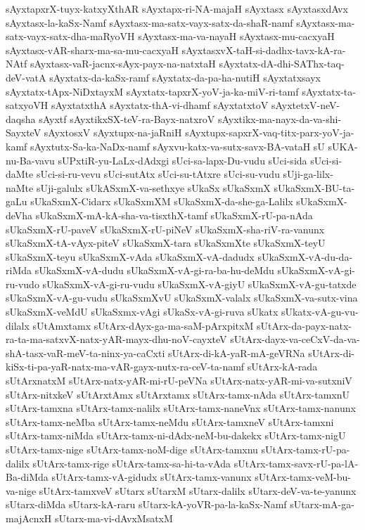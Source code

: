 {sAyxtapxrX-tuyx-katxyXthAR
sAyxtapx-ri-NA-majaH
sAyxtasx
sAyxtasxdAvx
sAyxtasx-la-kaSx-Namf
sAyxtasx-ma-satx-vayx-satx-da-shaR-namf
sAyxtasx-ma-satx-vayx-satx-dha-maRyoVH
sAyxtasx-ma-va-nayaH
sAyxtasx-mu-cacxyaH
sAyxtasx-vAR-sharx-ma-sa-mu-cacxyaH
sAyxtasxvX-taH-si-dadhx-tavx-kA-ra-NAtf
sAyxtasx-vaR-jacnx-sAyx-payx-na-natxtaH
sAyxtatx-dA-dhi-SAThx-taq-deV-vatA
sAyxtatx-da-kaSx-ramf
sAyxtatx-da-pa-ha-nutiH
sAyxtatxsayx
sAyxtatx-tApx-NiDxtayxM
sAyxtatx-tapxrX-yoV-ja-ka-miV-ri-tamf
sAyxtatx-ta-satxyoVH
sAyxtatxthA
sAyxtatx-thA-vi-dhamf
sAyxtatxtoV
sAyxtetxV-neV-daqsha
sAyxtf
sAyxtikxSX-teV-ra-Bayx-natxroV
sAyxtikx-ma-nayx-da-va-shi-SayxteV
sAyxtosxV
sAyxtupx-na-jaRniH
sAyxtupx-sapxrX-vaq-titx-parx-yoV-ja-kamf
sAyxtutx-Sa-ka-NaDx-namf
sAyxvu-katx-va-sutx-savx-BA-vataH
sU
sUKA-nu-Ba-vavu
sUPxtiR-yu-LaLx-dAdxgi
sUci-sa-lapx-Du-vudu
sUci-sida
sUci-si-daMte
sUci-si-ru-vevu
sUci-sutAtx
sUci-su-tAtxre
sUci-su-vudu
sUji-ga-lilx-naMte
sUji-galulx
sUkASxmX-va-sethxye
sUkaSx
sUkaSxmX
sUkaSxmX-BU-ta-gaLu
sUkaSxmX-Cidarx
sUkaSxmXM
sUkaSxmX-da-she-ga-Lalilx
sUkaSxmX-deVha
sUkaSxmX-mA-kA-sha-va-tisxthX-tamf
sUkaSxmX-rU-pa-nAda
sUkaSxmX-rU-paveV
sUkaSxmX-rU-piNeV
sUkaSxmX-sha-riV-ra-vanunx
sUkaSxmX-tA-vAyx-piteV
sUkaSxmX-tara
sUkaSxmXte
sUkaSxmX-teyU
sUkaSxmX-teyu
sUkaSxmX-vAda
sUkaSxmX-vA-dadudx
sUkaSxmX-vA-du-da-riMda
sUkaSxmX-vA-dudu
sUkaSxmX-vA-gi-ra-ba-hu-deMdu
sUkaSxmX-vA-gi-ru-vudo
sUkaSxmX-vA-gi-ru-vudu
sUkaSxmX-vA-giyU
sUkaSxmX-vA-gu-tatxde
sUkaSxmX-vA-gu-vudu
sUkaSxmXvU
sUkaSxmX-valalx
sUkaSxmX-va-sutx-vina
sUkaSxmX-veMdU
sUkaSxmx-vAgi
sUkaSx-vA-gi-ruva
sUkatx
sUkatx-vA-gu-vu-dilalx
sUtAmxtamx
sUtArx-dAyx-ga-ma-saM-pArxpitxM
sUtArx-da-payx-natx-ra-ta-ma-satxvX-natx-yAR-mayx-dhu-noV-cayxteV
sUtArx-dayx-va-ceCxV-da-va-shA-tasx-vaR-meV-ta-ninx-ya-caCxti
sUtArx-di-kA-yaR-mA-geVRNa
sUtArx-di-kiSx-ti-pa-yaR-natx-ma-vAR-gayx-nutx-ra-ceV-ta-namf
sUtArx-kA-rada
sUtArxnatxM
sUtArx-natx-yAR-mi-rU-peVNa
sUtArx-natx-yAR-mi-va-sutxniV
sUtArx-nitxkeV
sUtArxtAmx
sUtArxtamx
sUtArx-tamx-nAda
sUtArx-tamxnU
sUtArx-tamxna
sUtArx-tamx-nalilx
sUtArx-tamx-naneVnx
sUtArx-tamx-nanunx
sUtArx-tamx-neMba
sUtArx-tamx-neMdu
sUtArx-tamxneV
sUtArx-tamxni
sUtArx-tamx-niMda
sUtArx-tamx-ni-dAdx-neM-bu-dakekx
sUtArx-tamx-nigU
sUtArx-tamx-nige
sUtArx-tamx-noM-dige
sUtArx-tamxnu
sUtArx-tamx-rU-pa-dalilx
sUtArx-tamx-rige
sUtArx-tamx-sa-hi-ta-vAda
sUtArx-tamx-savx-rU-pa-lA-Ba-diMda
sUtArx-tamx-vA-gidudx
sUtArx-tamx-vanunx
sUtArx-tamx-veM-bu-va-nige
sUtArx-tamxveV
sUtarx
sUtarxM
sUtarx-dalilx
sUtarx-deV-va-te-yanunx
sUtarx-diMda
sUtarx-kA-raru
sUtarx-kA-yoVR-pa-la-kaSx-Namf
sUtarx-mA-ga-majAcnxH
sUtarx-ma-vi-dAvxMsatxM
}
